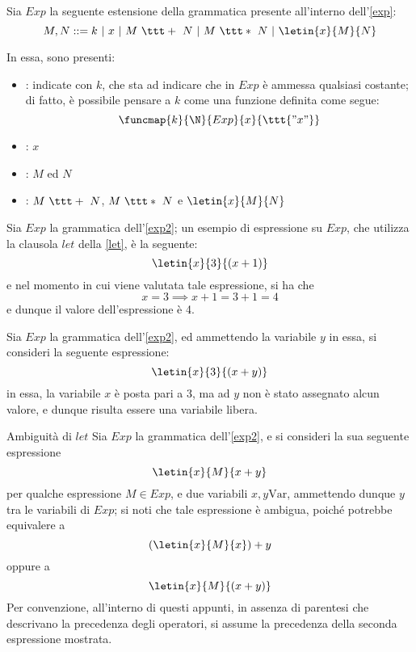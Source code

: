 \documentclass[a4paper, 12pt]{report}
\begin{document}
    \begin{example}
        \label{exp2}
        Sia $Exp$ la seguente estensione della grammatica presente all'interno dell'\cref{exp}: $$M, N ::= k \ | \ x \ | \ M \ \ttt + \ N \ | \ M \ \ttt * \ N \ | \ \letin{x}{M}{N}$$

        In essa, sono presenti:

        \begin{itemize}
            \item {}: indicate con $k$, che sta ad indicare che in $Exp$ è ammessa qualsiasi costante; di fatto, è possibile pensare a $k$ come una funzione definita come segue: $$\funcmap{k}{\N}{Exp}{x}{\ttt{"x"}}$$
            \item {}: $x$
            \item {}: $M$ ed $N$
            \item {}: $M \ \ttt + \ N$, $M \ \ttt * \ N$ e $\letin{x}{M}{N}$
        \end{itemize}
    \end{example}

    \begin{example}
        Sia $Exp$ la grammatica dell'\cref{exp2}; un esempio di espressione su $Exp$, che utilizza la clausola $let$ della \cref{let}, è la seguente: $$\letin{x}{3}{(x + 1)}$$ e nel momento in cui viene valutata tale espressione, si ha che $$x = 3 \implies x + 1 = 3 + 1 = 4$$ e dunque il valore dell'espressione è 4.
    \end{example}

    \begin{example}
        Sia $Exp$ la grammatica dell'\cref{exp2}, ed ammettendo la variabile $y$ in essa, si consideri la seguente espressione: $$\letin{x}{3}{(x + y)}$$ in essa, la variabile $x$ è posta pari a 3, ma ad $y$ non è stato assegnato alcun valore, e dunque risulta essere una variabile libera.
    \end{example}

    \begin{framedobs}{Ambiguità di $let$}
        Sia $Exp$ la grammatica dell'\cref{exp2}, e si consideri la sua seguente espressione $$\letin{x}{M}{x + y}$$ per qualche espressione $M \in Exp$, e due variabili $x, y \mathrm{Var}$, ammettendo dunque $y$ tra le variabili di $Exp$; si noti che tale espressione è ambigua, poiché potrebbe equivalere a $$(\letin{x}{M}{x}) + y$$ oppure a $$\letin{x}{M}{(x + y)}$$ Per convenzione, all'interno di questi appunti, in assenza di parentesi che descrivano la precedenza degli operatori, si assume la precedenza della seconda espressione mostrata.
    \end{framedobs}
\end{document}
